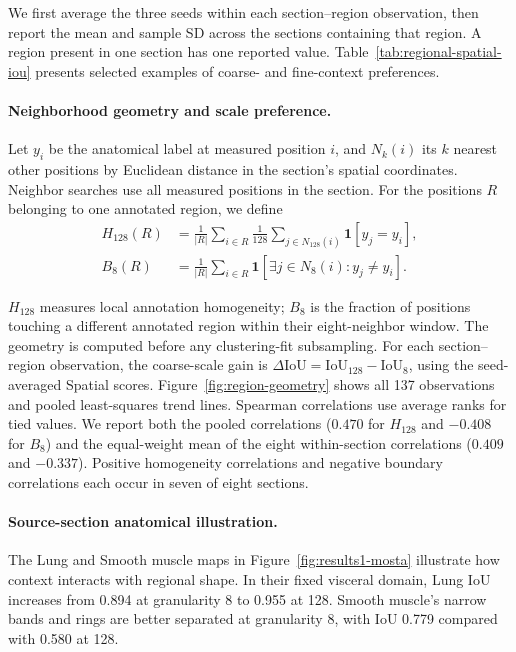 We first average the three seeds within each section--region observation, then report the mean and sample SD across the sections containing that region. A region present in one section has one reported value. Table~\ref{tab:regional-spatial-iou} presents selected examples of coarse- and fine-context preferences.

\begin{samepage}
\paragraph{Neighborhood geometry and scale preference.}
Let $y_i$ be the anatomical label at measured position $i$, and $N_k(i)$ its $k$ nearest other positions by Euclidean distance in the section's spatial coordinates. Neighbor searches use all measured positions in the section. For the positions $R$ belonging to one annotated region, we define
\begin{align}
H_{128}(R) &= \frac{1}{|R|}\sum_{i\in R}\frac{1}{128}\sum_{j\in N_{128}(i)}\mathbf{1}[y_j=y_i],
\label{eq:region-homogeneity}\\
B_8(R) &= \frac{1}{|R|}\sum_{i\in R}\mathbf{1}\!\left[\exists j\in N_8(i):y_j\ne y_i\right].
\label{eq:region-boundary}
\end{align}
\end{samepage}
$H_{128}$ measures local annotation homogeneity; $B_8$ is the fraction of positions touching a different annotated region within their eight-neighbor window. The geometry is computed before any clustering-fit subsampling. For each section--region observation, the coarse-scale gain is $\Delta\mathrm{IoU}=\mathrm{IoU}_{128}-\mathrm{IoU}_{8}$, using the seed-averaged Spatial scores. Figure~\ref{fig:region-geometry} shows all 137 observations and pooled least-squares trend lines. Spearman correlations use average ranks for tied values. We report both the pooled correlations ($0.470$ for $H_{128}$ and $-0.408$ for $B_8$) and the equal-weight mean of the eight within-section correlations ($0.409$ and $-0.337$). Positive homogeneity correlations and negative boundary correlations each occur in seven of eight sections.



\paragraph{Source-section anatomical illustration.}
The Lung and Smooth muscle maps in Figure~\ref{fig:results1-mosta} illustrate how context interacts with regional shape. In their fixed visceral domain, Lung IoU increases from 0.894 at granularity 8 to 0.955 at 128. Smooth muscle's narrow bands and rings are better separated at granularity 8, with IoU 0.779 compared with 0.580 at 128.


